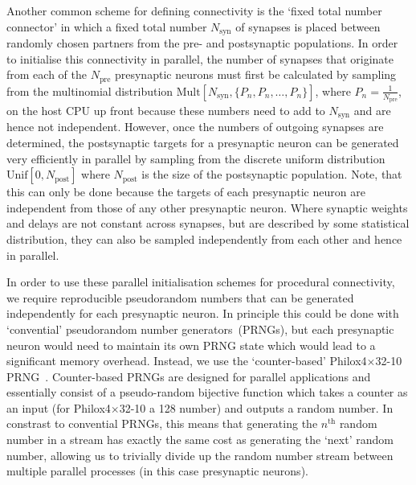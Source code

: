 \documentclass[9pt,a4paper]{amsart}
\newcommand{\todo}[1]{\textbf{\textsc{\textcolor{red}{(TODO: #1)}}}}
\begin{document}
Another common scheme for defining connectivity is the `fixed total number connector' in which a fixed total number $N_{\text{syn}}$ of synapses is placed between randomly chosen partners from the pre- and postsynaptic populations.
In order to initialise this connectivity in parallel, the number of synapses that originate from each of the $N_{\text{pre}}$ presynaptic neurons must first be calculated by sampling from the multinomial distribution $\text{Mult}[N_{\text{syn}}, \{P_{n}, P_{n}, \ldots, P_{n}\}]$, where $P_{n} = \frac{1}{N_{\text{pre}}}$, on the host CPU up front because these numbers need to add to $N_{\text{syn}}$ and are hence not independent.
However, once the numbers of outgoing synapses are determined, the postsynaptic targets for a presynaptic neuron can be generated very efficiently in parallel by sampling from the discrete uniform distribution $\text{Unif}[0, N_{\text{post}}]$ where $N_{\text{post}}$ is the size of the postsynaptic population.
Note, that this can only be done because the targets of each presynaptic neuron are independent from those of any other presynaptic neuron.
Where synaptic weights and delays are not constant across synapses, but are described by some statistical distribution, they can also be sampled independently from each other and hence in parallel.
%

In order to use these parallel initialisation schemes for procedural connectivity, we require reproducible pseudorandom numbers that can be generated independently for each presynaptic neuron.
In principle this could be done with `convential' pseudorandom  number generators~(PRNGs), but each presynaptic neuron would need to maintain its own PRNG state which would lead to a significant memory overhead.
Instead, we use the `counter-based' Philox4$\times$32-10 PRNG~\citep{Salmon2011}.
Counter-based PRNGs are designed for parallel applications and essentially consist of a pseudo-random bijective function which takes a counter as an input (for Philox4$\times$32-10 a \SI{128}{\bit} number) and outputs a random number.
In constrast to convential PRNGs, this means that generating the $n^\text{th}$ random number in a stream has exactly the same cost as generating the `next' random number, allowing us to trivially divide up the random number stream between multiple parallel processes (in this case presynaptic neurons).
\end{document}
